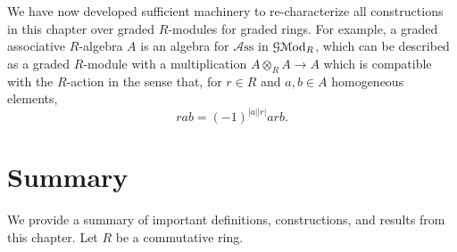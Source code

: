 We have now developed sufficient machinery to re-characterize all constructions in this chapter over graded $R$-modules for graded rings. For example, a graded associative $R$-algebra $A$ is an algebra for $\mathcal{A} \mathrm{ss} $ in $\mathcal{G} \mathcal{M}\mathrm{od} _R$, which can be described as a graded $R$-module with a multiplication $A\otimes _RA\to A$ which is compatible with the $R$-action in the sense that, for $r\in R$ and $a,b\in A$ homogeneous elements,
\[
	rab = (-1)^{\left| a \right| \left| r \right| } arb
.\]

\section{Summary}\label{sec:1.5}

We provide a summary of important definitions, constructions, and results from this chapter. Let $R$ be a commutative ring.
